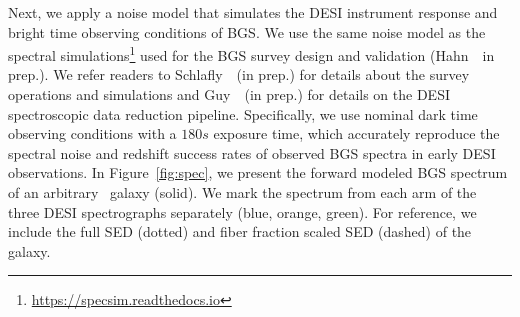 Next, we apply a noise model that simulates the DESI instrument response and
bright time observing conditions of BGS. 
We use the same noise model as the spectral 
simulations\footnote{\href{https://specsim.readthedocs.io/en/stable/guide.html}{https://specsim.readthedocs.io}} 
used for the BGS survey design and validation (Hahn~\etal~in prep.). 
We refer readers to Schlafly~\etal~(in prep.) for details about the survey
operations and simulations and Guy~\etal~(in prep.) for details on the DESI
spectroscopic data reduction pipeline.
Specifically, we use nominal dark time observing conditions with a $180s$
exposure time, which accurately reproduce the spectral noise and redshift
success rates of observed BGS spectra in early DESI observations.
In Figure~\ref{fig:spec}, we present the forward modeled BGS spectrum of an
arbitrary \lgal~galaxy (solid). 
We mark the spectrum from each arm of the three DESI spectrographs separately 
(blue, orange, green).
For reference, we include the full SED (dotted) and fiber fraction scaled SED
(dashed) of the galaxy. 



